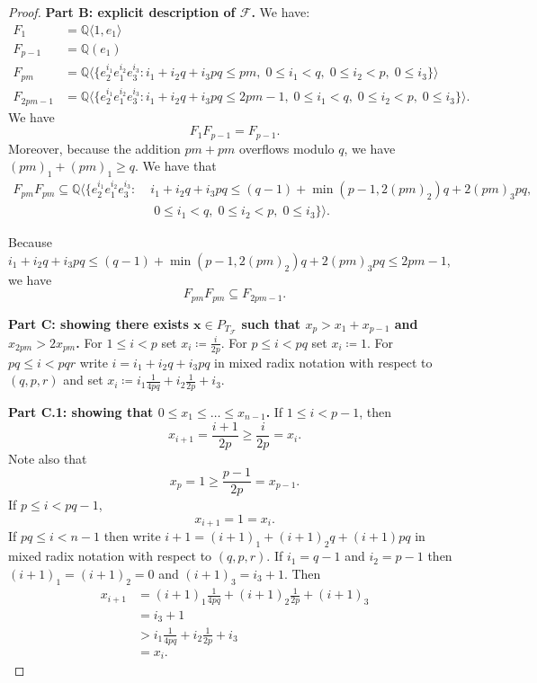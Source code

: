 \documentclass[letterpaper,10pt]{amsart}
\newcommand{\QQ}{\mathbb{Q}}      %
\newcommand{\la}{\langle}
\newcommand{\ra}{\rangle}
\newcommand{\cF}{\mathcal{F}}
\theoremstyle{definition}
\theoremstyle{remark}
\begin{document}
\begin{proof}
\noindent \textbf{Part B: explicit description of $\cF$.}
We have:
\begin{align*}
F_1 &= \QQ \la 1, e_1 \ra \\
F_{p-1} &= \QQ( e_1 ) \\
F_{pm} &= \QQ\la \{e_2^{i_1}e_1^{i_2}e_3^{i_3} : i_1 + i_2q + i_3pq \leq pm, \; 0 \leq i_1 < q, \; 0 \leq i_2 < p, \; 0 \leq i_3\}\ra \\
F_{2pm-1} &= \QQ\la \{e_2^{i_1}e_1^{i_2}e_3^{i_3} : i_1 + i_2q + i_3pq \leq 2pm-1, \; 0 \leq i_1 < q, \; 0 \leq i_2 < p, \; 0 \leq i_3 \}\ra.
\end{align*}
We have 
\[
F_1F_{p-1}  = F_{p-1}.
\]
Moreover, because the addition $pm + pm$ overflows modulo $q$, we have $(pm)_1 + (pm)_1 \geq q$. We have that
\begin{align*}
F_{pm}F_{pm} \subseteq \QQ \la \{e_2^{i_1}e_1^{i_2}e_3^{i_3} : \; &i_1 + i_2q + i_3pq \leq (q-1) + \min(p-1,2(pm)_2) q + 2(pm)_3 pq, \\
&\; 0 \leq i_1 < q, \; 0 \leq i_2 < p, \; 0 \leq i_3\} \ra.
\end{align*}

Because $i_1 + i_2q + i_3pq \leq (q-1) + \min(p-1,2(pm)_2) q + 2(pm)_3 pq \leq 2pm-1$, we have
\[
	F_{pm}F_{pm} \subseteq F_{2pm-1}.
\]

\noindent \textbf{Part C: showing there exists $\mathbf{x} \in P_{T_{\cF}}$ such that $x_p > x_1 + x_{p-1}$ and $x_{2pm} > 2x_{pm}$.} For $1 \leq i < p$ set $x_i \coloneqq \frac{i}{2p}$. For $p \leq i < pq$ set $x_i \coloneqq 1$. For $pq \leq i < pqr$ write $i = i_1 + i_2q + i_3pq$ in mixed radix notation with respect to $(q,p,r)$ and set $x_i \coloneqq i_1 \frac{1}{4pq} + i_2 \frac{1}{2p} + i_3$. 

\noindent \textbf{Part C.1: showing that $0 \leq x_1 \leq \dots \leq x_{n-1}$.}
If $1 \leq i < p-1$, then
\[
	x_{i + 1} = \frac{i+1}{2p} \geq \frac{i}{2p} = x_i.
\]
Note also that
\[
	x_p = 1 \geq \frac{p-1}{2p} = x_{p-1}.
\]
If $p \leq i < pq-1$,
\[
	x_{i+1} = 1 = x_i.
\]
If $pq \leq i < n-1$ then write $i+1 = (i+1)_1 + (i+1)_2q + (i+1)pq$ in mixed radix notation with respect to $(q,p,r)$. If $i_1=q-1$ and $i_2 = p-1$ then $(i+1)_1 = (i+1)_2 = 0$ and $(i+1)_3 = i_3 + 1$. Then
\begin{align*}
x_{i+1} &= (i+1)_1 \frac{1}{4pq} + (i+1)_2 \frac{1}{2p} + (i+1)_3 \\
&= i_3 + 1 \\
&> i_1 \frac{1}{4pq} + i_2 \frac{1}{2p} + i_3 \\
&= x_{i}.
\end{align*}


\end{proof}
\end{document}
